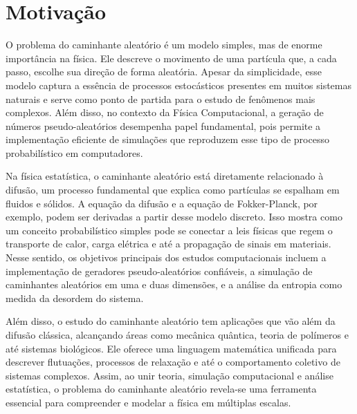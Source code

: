\chapter*{Motivação}
O problema do caminhante aleatório é um modelo simples, mas de enorme importância 
na física. Ele descreve o movimento de uma partícula que, a cada passo, escolhe sua 
direção de forma aleatória. Apesar da simplicidade, esse modelo captura a essência 
de processos estocásticos presentes em muitos sistemas naturais e serve como ponto 
de partida para o estudo de fenômenos mais complexos. Além disso, no contexto da 
Física Computacional, a geração de números pseudo-aleatórios desempenha papel 
fundamental, pois permite a implementação eficiente de simulações que reproduzem 
esse tipo de processo probabilístico em computadores.

Na física estatística, o caminhante aleatório está diretamente relacionado à difusão, 
um processo fundamental que explica como partículas se espalham em fluidos e sólidos. 
A equação da difusão e a equação de Fokker-Planck, por exemplo, podem ser derivadas 
a partir desse modelo discreto. Isso mostra como um conceito probabilístico simples 
pode se conectar a leis físicas que regem o transporte de calor, carga elétrica e até 
a propagação de sinais em materiais. Nesse sentido, os objetivos principais dos estudos 
computacionais incluem a implementação de geradores pseudo-aleatórios confiáveis, 
a simulação de caminhantes aleatórios em uma e duas dimensões, e a análise da entropia 
como medida da desordem do sistema.

Além disso, o estudo do caminhante aleatório tem aplicações que vão além da difusão 
clássica, alcançando áreas como mecânica quântica, teoria de polímeros e até sistemas 
biológicos. Ele oferece uma linguagem matemática unificada para descrever flutuações, 
processos de relaxação e até o comportamento coletivo de sistemas complexos. Assim, 
ao unir teoria, simulação computacional e análise estatística, o problema do caminhante 
aleatório revela-se uma ferramenta essencial para compreender e modelar a física em 
múltiplas escalas.
